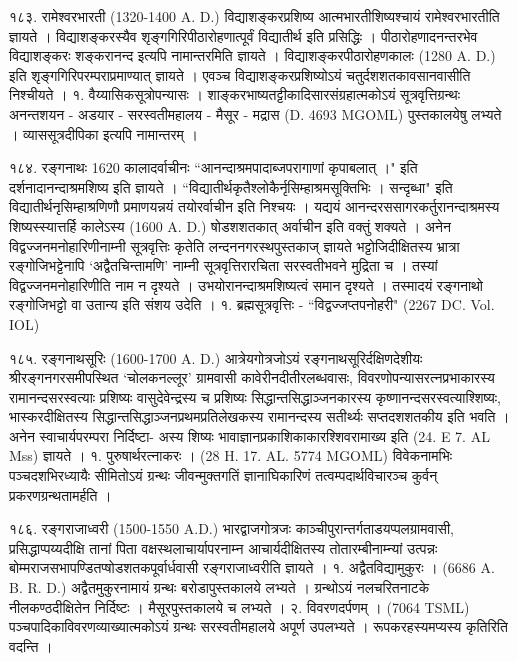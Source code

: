 १८३. रामेश्वरभारती (1320-1400 A. D.)
विद्याशङ्करप्रशिष्य आत्मभारतीशिष्यश्चायं रामेश्वरभारतीति ज्ञायते । विद्याशङ्करस्यैव शृङ्गगिरिपीठारोहणात्पूर्वं विद्यातीर्थ इति प्रसिद्धिः । पीठारोहणादनन्तरभेव विद्याशङ्करः शङ्करानन्द इत्यपि नामान्तरमिति ज्ञायते । विद्याशङ्करपीठारोहणकालः (1280 A. D.) इति शृङ्गगिरिपरम्पराप्रमाण्यात् ज्ञायते । एवञ्च विद्याशङ्करप्रशिष्योऽयं चतुर्दशशतकावसानवासीति निश्चीयते ।
१. वैय्यासिकसूत्रोपन्यासः । शाङ्करभाष्यतट्टीकादिसारसंग्रहात्मकोऽयं सूत्रवृत्तिग्रन्थः अनन्तशयन - अडयार - सरस्वतीमहालय - मैसूर - मद्रास (D. 4693 MGOML) पुस्तकालयेषु लभ्यते । व्याससूत्रदीपिका इत्यपि नामान्तरम् ।

१८४. रङ्गनाथः 1620 कालादर्वाचीनः
``आनन्दाश्रमपादाब्जपरागाणां कृपाबलात् ।" इति दर्शनादानन्दाश्रमशिष्य इति ज्ञायते । ``विद्यातीर्थकृतैश्लोकैर्नृसिम्हाश्रमसूक्तिभिः । सन्दृब्धा" इति विद्यातीर्थनृसिम्हाश्रणिणौ प्रमाणयन्नयं तयोरर्वाचीन इति निश्चयः । यद्ययं आनन्दरससागरकर्तुरानन्दाश्रमस्य शिष्यस्स्यात्तर्हि कालेऽस्य (1600 A. D.) षोडशशतकात् अर्वाचीन इति वक्तुं शक्यते । अनेन विद्वज्जनमनोहारिणीनाम्नी सूत्रवृत्तिः कृतेति लन्दननगरस्थपुस्तकाज् ज्ञायते भट्टोजिदीक्षितस्य भ्रात्रा रङ्गोजिभट्टेनापि `अद्वैतचिन्तामणि' नाम्नी सूत्रवृत्तिरारचिता सरस्वतीभवने मुद्रिता च । तस्यां विद्वज्जनमनोहारिणीति नाम न दृश्यते । उभयोरानन्दाश्रमशिष्यत्वं समान दृश्यते । तस्मादयं रङ्गनाथो रङ्गोजिभट्टो वा उतान्य इति संशय उदेति ।
१. ब्रह्मसूत्रवृत्तिः - ``विद्वज्जप्तपनोहरी" (2267 DC. Vol. IOL)

१८५. रङ्गनाथसूरिः (1600-1700 A. D.)
आत्रेयगोत्रजोऽयं रङ्गनाथसूरिर्दक्षिणदेशीयः श्रीरङ्गनगरसमीपस्थित `चोलकनल्लूर' ग्रामवासी कावेरीनदीतीरलब्धवासः, विवरणोपन्यासरत्नप्रभाकारस्य रामानन्दसरस्वत्याः प्रशिष्यः वासुदेवेन्द्रस्य च प्रशिष्यः सिद्धान्तसिद्धाञ्जनकारस्य कृष्णानन्दसरस्वत्याश्शिष्यः, भास्करदीक्षितस्य सिद्धान्तसिद्धाञ्जनप्रथमप्रतिलेखकस्य रामानन्दस्य सतीर्थ्यः सप्तदशशतकीय इति भवति । अनेन स्वाचार्यपरम्परा निर्दिष्टा-
अस्य शिष्यः भावाज्ञानप्रकाशिकाकारश्शिवरामाख्य इति (24. E 7. AL Mss) ज्ञायते ।
१. पुरुषार्थरत्नाकरः । (28 H. 17. AL. 5774 MGOML) विवेकनामभिः पञ्चदशभिरध्यायैः सीमितोऽयं ग्रन्थः जीवन्मुक्तगतिं ज्ञानाघिकारिणं तत्वम्पदार्थविचारञ्च कुर्वन् प्रकरणग्रन्थतामर्हति ।

१८६. रङ्गराजाध्वरी (1500-1550 A.D.)
भारद्वाजगोत्रजः काञ्चीपुरान्तर्गताडयप्पलग्रामवासी, प्रसिद्धाप्पय्यदीक्षि तानां पिता वक्षस्थलाचार्यापरनाम्न आचार्यदीक्षितस्य तोतारम्बीनाम्न्यां उत्पन्नः बोम्मराजसभापण्डितप्षोडशतकपूर्वार्धवासी रङ्गराजाध्वरीति ज्ञायते ।
१. अद्वैतविद्यामुकुरः । (6686 A. B. R. D.) अद्वैतमुकुरनामायं ग्रन्थः बरोडापुस्तकालये लभ्यते । ग्रन्थोऽयं नलचरितनाटके नीलकण्ठदीक्षितेन निर्दिष्टः । मैसूरपुस्तकालये च लभ्यते ।
२. विवरणदर्पणम् । (7064 TSML) पञ्चपादिकाविवरणव्याख्यात्मकोऽयं ग्रन्थः सरस्वतीमहालये अपूर्ण उपलभ्यते । रूपकरहस्यमप्यस्य कृतिरिति वदन्ति ।

